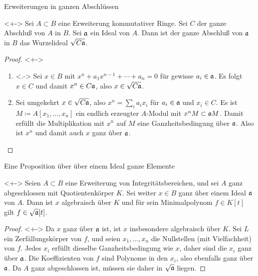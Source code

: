 \begin{frame}{Erweiterungen in ganzen Abschlüssen}
	\begin{lemma}<+->
		Sei \(A \subset B\) eine Erweiterung kommutativer Ringe. Sei \(C\) der
		ganze Abschluß von \(A\) in \(B\). Sei \(\mathfrak{a}\) ein Ideal von
		\(A\). Dann ist der ganze Abschluß von \(\mathfrak{a}\) in \(B\)
		das Wurzelideal \(\sqrt{C \mathfrak{a}}\).
	\end{lemma}
	\begin{proof}<+->
		\begin{enumerate}[<+->]
		\item<.->
			Sei \(x \in B\) mit \(x^n + a_1 x^{n - 1} + \dotsb + a_n = 0\)
			für gewisse \(a_i \in \mathfrak{a}\).
			Es folgt \(x \in C\) und damit \(x^n \in C \mathfrak{a}\), also
			\(x \in \sqrt{C \mathfrak{a}}\).
		\item
			Sei umgekehrt \(x \in \sqrt{C \mathfrak{a}}\), also \(x^n = \sum_i
			a_i x_i\) für \(a_i \in \mathfrak{a}\) und \(x_i \in C\). Es ist
			\(M \coloneqq A[x_1, \dotsc, x_n]\) ein endlich erzeugter
			\(A\)-Modul mit \(x^n M \subset \mathfrak{a} M\). Damit erfüllt
			die Multiplikation mit \(x^n\) auf \(M\) eine Ganzheitsbedingung
			über \(\mathfrak{a}\). Also ist \(x^n\) und damit auch \(x\) ganz über
			\(\mathfrak{a}\).
			\qedhere
		\end{enumerate}
	\end{proof}
\end{frame}

\begin{frame}{Eine Proposition über über einem Ideal ganze Elemente}
	\begin{proposition}<+->
		Seien \(A \subset B\) eine Erweiterung von Integritätsbereichen, und
		sei \(A\) ganz abgeschlossen mit Quotientenkörper \(K\). Sei weiter
		\(x \in B\) ganz über einem Ideal \(\mathfrak{a}\) von \(A\). Dann ist
		\(x\) algebraisch über \(K\) und für sein Minimalpolynom
		\(f \in K[t]\) gilt \(f \in \sqrt{\mathfrak{a}}[t]\).
	\end{proposition}
	\begin{proof}<+->
		Da \(x\) ganz über \(\mathfrak{a}\) ist, ist \(x\) insbesondere algebraisch
		über \(K\). Sei \(L\) ein Zerfällungskörper von \(f\),
		und seien \(x_1, \dotsc, x_n\) die Nullstellen (mit Vielfachheit)
		von \(f\). Jedes \(x_i\) erfüllt dieselbe Ganzheitsbedingung wie \(x\),
		daher sind die \(x_i\) ganz über \(\mathfrak{a}\).
		Die Koeffizienten von \(f\) sind Polynome in den \(x_i\), also
		ebenfalls ganz über \(\mathfrak{a}\). Da \(A\) ganz abgeschlossen ist,
		müssen sie daher in \(\sqrt{\mathfrak{a}}\) liegen.
	\end{proof}
\end{frame}

